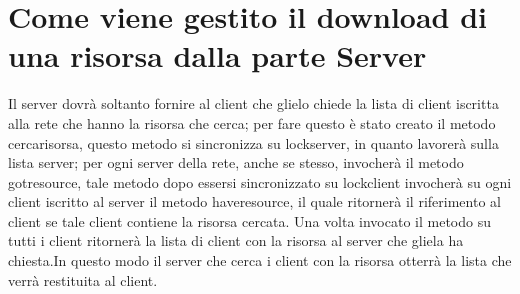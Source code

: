 \documentclass[12pt]{article}
\begin{document}
\section{Come viene gestito il download di una risorsa dalla parte Server}
Il server dovrà soltanto fornire al client che glielo chiede la lista di client iscritta alla rete che hanno la risorsa che cerca; per fare questo è stato creato il metodo cercarisorsa, questo metodo si sincronizza su lockserver, in quanto lavorerà sulla lista server; per ogni server della rete, anche se stesso, invocherà il metodo gotresource, tale metodo dopo essersi sincronizzato su lockclient invocherà su ogni client iscritto al server il metodo haveresource, il quale ritornerà il riferimento al client se tale client contiene la risorsa cercata. Una volta invocato il metodo su tutti i client ritornerà la lista di client con la risorsa al server che gliela ha chiesta.In questo modo il server che cerca i client con la risorsa otterrà la lista che verrà restituita al client.
\end{document}
